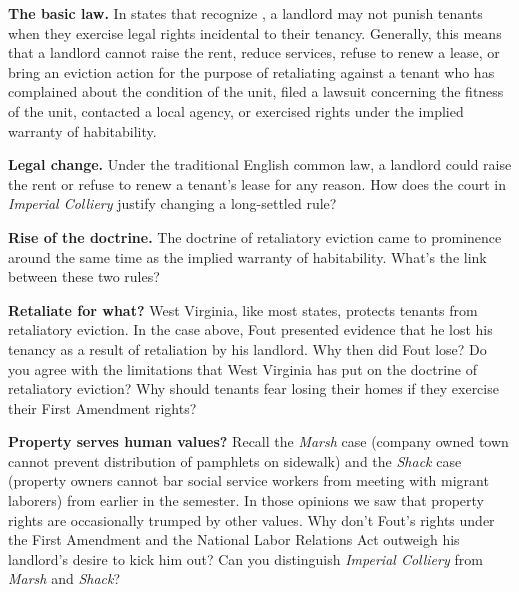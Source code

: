 
\item \textbf{The basic law.} In states that recognize , a
landlord may not punish tenants when they exercise legal rights incidental to
their tenancy.  Generally, this means that a landlord cannot raise the rent,
reduce services, refuse to renew a lease, or bring an eviction action for the
purpose of retaliating against a tenant who has complained about the condition
of the unit, filed a lawsuit concerning the fitness of the unit, contacted a
local agency, or exercised rights under the implied warranty of habitability.  


\item \textbf{Legal change.} Under the traditional English common law, a
landlord could raise the rent or refuse to renew a tenant's lease for any
reason.  How does the court in \textit{Imperial Colliery} justify changing a
long-settled rule?


\item \textbf{Rise of the doctrine.} The doctrine of retaliatory eviction came
to prominence around the same time as the implied warranty of habitability. 
What's the link between these two rules?  


\item \textbf{Retaliate for what?} West Virginia, like most states, protects
tenants from retaliatory eviction. In the case above, Fout presented evidence
that he lost his tenancy as a result of retaliation by his landlord.  Why then
did Fout lose?  Do you agree with the limitations that West Virginia has put on
the doctrine of retaliatory eviction?  Why should tenants fear losing their
homes if they exercise their First Amendment rights?


\item \textbf{Property serves human values?} Recall the \textit{Marsh} case
(company owned town cannot prevent distribution of pamphlets on sidewalk) and
the \textit{Shack} case (property owners cannot bar social service workers from
meeting with migrant laborers) from earlier in the semester.  In those opinions
we saw that property rights are occasionally trumped by other values.  Why don't
Fout's rights under the First Amendment and the National Labor Relations Act
outweigh his landlord's desire to kick him out?  Can you distinguish
\textit{Imperial Colliery} from \textit{Marsh} and \textit{Shack}?  


